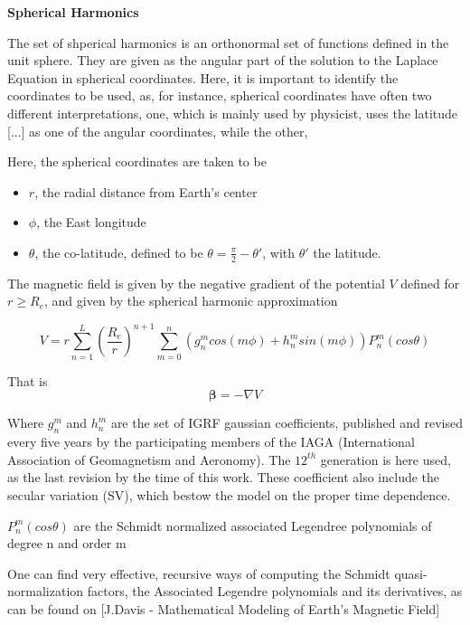
{\bf Spherical Harmonics}

The set of shperical harmonics is an orthonormal set of functions defined in the unit sphere. They are given as the angular part of the solution to the Laplace Equation in spherical coordinates. Here, it is important to identify the coordinates to be used, as, for instance, spherical coordinates have often two different interpretations, one, which is mainly used by physicist, uses the latitude [...] as one of the angular coordinates, while the other, 

Here, the spherical coordinates are taken to be
\begin{itemize} 
\item[] $r$, the radial distance from Earth's center
\item[] $\phi$, the East longitude %
\item[] $\theta$, the co-latitude, defined to be $\theta = \frac{\pi}{2} - \theta'$, with $\theta'$ the latitude. %
\end{itemize}


The magnetic field is given by the negative gradient of the potential $V$ defined for $r \geq R_e$, and given by the spherical harmonic approximation

\begin{equation} \label{eq:igrf_potential}
V = r \sum_{n=1}^{L} \left(\dfrac{R_e}{r}\right)^{n+1} \sum_{m=0}^{n} \left(g_n^m cos(m\phi) + h_n^m sin(m\phi)\right) P_n^m(cos\theta)
\end{equation}

That is
\begin{equation}
{\bm \beta} = -\nabla V
\end{equation}


Where $g_n^m$ and $h_n^m$ are the set of IGRF gaussian coefficients, published and revised every five years by the participating members of the IAGA (International Association
of Geomagnetism and Aeronomy). The $12^{th}$ generation is here used, as the last revision by the time of this work. These coefficient also include the secular variation (SV), which bestow the model on the proper time dependence.

$P_n^m(cos \theta)$ are the Schmidt normalized associated Legendree polynomials of degree n and order m

One can find very effective, recursive ways of computing the Schmidt quasi-normalization factors, the Associated Legendre polynomials and its derivatives, as can be found on [J.Davis - Mathematical Modeling of Earth’s Magnetic Field] %

